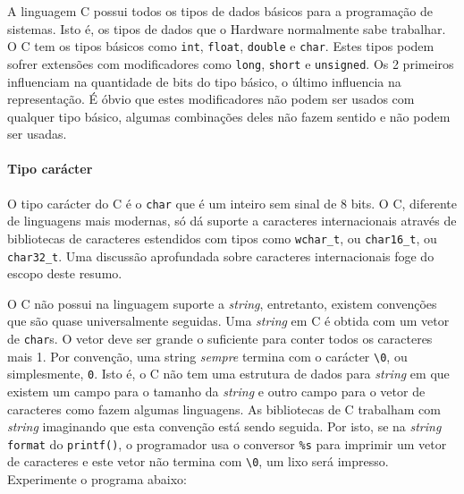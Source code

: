 \documentclass[
]{article}
\begin{document}
A linguagem C possui todos os tipos de dados básicos para a programação
de sistemas. Isto é, os tipos de dados que o Hardware normalmente sabe
trabalhar. O C tem os tipos básicos como \texttt{int}, \texttt{float},
\texttt{double} e \texttt{char}. Estes tipos podem sofrer extensões com
modificadores como \texttt{long}, \texttt{short} e \texttt{unsigned}. Os
2 primeiros influenciam na quantidade de bits do tipo básico, o último
influencia na representação. É óbvio que estes modificadores não podem
ser usados com qualquer tipo básico, algumas combinações deles não fazem
sentido e não podem ser usadas.

\hypertarget{tipo-caruxe1cter}{%
\paragraph{Tipo carácter}\label{tipo-caruxe1cter}}

O tipo carácter do C é o \texttt{char} que é um inteiro sem sinal de 8
bits. O C, diferente de linguagens mais modernas, só dá suporte a
caracteres internacionais através de bibliotecas de caracteres
estendidos com tipos como \texttt{wchar\_t}, ou \texttt{char16\_t}, ou
\texttt{char32\_t}. Uma discussão aprofundada sobre caracteres
internacionais foge do escopo deste resumo.

O C não possui na linguagem suporte a \emph{string}, entretanto, existem
convenções que são quase universalmente seguidas. Uma \emph{string} em C
é obtida com um vetor de \texttt{char}s. O vetor deve ser grande o
suficiente para conter todos os caracteres mais 1. Por convenção, uma
string \emph{sempre} termina com o carácter
\texttt{\textquotesingle{}\textbackslash{}0\textquotesingle{}}, ou
simplesmente, \texttt{0}. Isto é, o C não tem uma estrutura de dados
para \emph{string} em que existem um campo para o tamanho da
\emph{string} e outro campo para o vetor de caracteres como fazem
algumas linguagens. As bibliotecas de C trabalham com \emph{string}
imaginando que esta convenção está sendo seguida. Por isto, se na
\emph{string} \texttt{format} do \texttt{printf()}, o programador usa o
conversor \texttt{\%s} para imprimir um vetor de caracteres e este vetor
não termina com
\texttt{\textquotesingle{}\textbackslash{}0\textquotesingle{}}, um lixo
será impresso. Experimente o programa abaixo:
\end{document}

